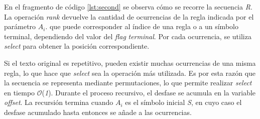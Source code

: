 En el fragmento de código \ref{lst:second} se observa cómo se recorre la secuencia \textit{R}. La operación \textit{rank} devuelve la cantidad de ocurrencias de la regla indicada por el parámetro $A_i$. que puede corresponder al índice de una regla o a un símbolo terminal, dependiendo del valor del \textit{flag} \textit{terminal}. Por cada ocurrencia, se utiliza \textit{select} para obtener la posición correspondiente.

Si el texto original es repetitivo, pueden existir muchas ocurrencias de una misma regla, lo que hace que \textit{select} sea la operación más utilizada. Es por esta razón que la secuencia se representa mediante permutaciones, lo que permite realizar \textit{select} en tiempo $\mathcal{O}$(\textit{1}). Durante el proceso recursivo, el desfase se acumula en la variable \textit{offset}. La recursión termina cuando $A_i$ es el símbolo inicial \textit{S}, en cuyo caso el desfase acumulado hasta entonces se añade a las ocurrencias.

\iffalse

